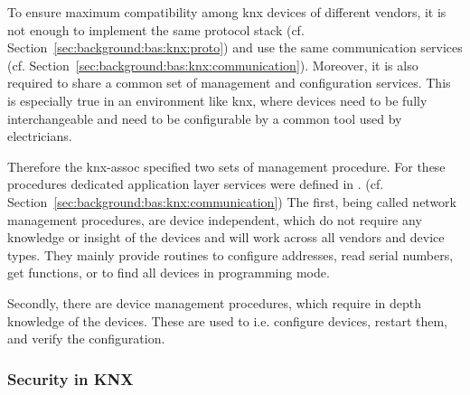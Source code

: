 To ensure maximum compatibility among \gls{knx} devices of different vendors, it is not enough to implement the same protocol stack (cf. Section~\ref{sec:background:bas:knx:proto}) and use the same communication services (cf. Section~\ref{sec:background:bas:knx:communication}).
Moreover, it is also required to share a common set of management and configuration services.
This is especially true in an environment like \gls{knx}, where devices need to be fully interchangeable and need to be configurable by a common tool used by electricians.

Therefore the \gls{knx-assoc} specified two sets of management procedure.
For these procedures dedicated application layer services were defined in \textcite{DIN_EN_50090-4-1}. (cf. Section~\ref{sec:background:bas:knx:communication})
The first, being called network management procedures, are device independent, which do not require any knowledge or insight of the devices and will work across all vendors and device types. \parencite[pp.~11~ff.]{DIN_EN_50090-7-1}
They mainly provide routines to configure addresses, read serial numbers, get functions, or to find all devices in programming mode.

Secondly, there are device management procedures, which require in depth knowledge of the devices. \parencite[pp.~30~ff.]{DIN_EN_50090-7-1}
These are used to i.e. configure devices, restart them, and verify the configuration.

\subsubsection{Security in KNX}
\label{sec:background:bas:knx:security}


